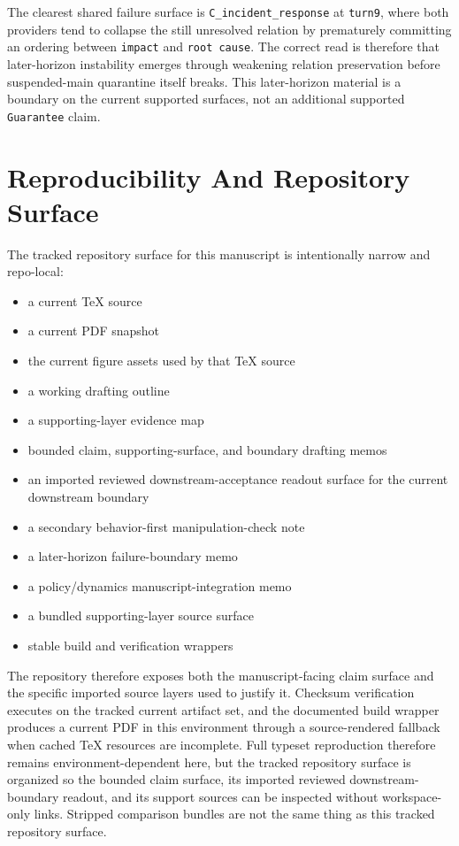 \documentclass[11pt]{article}
\begin{document}
The clearest shared failure surface is \texttt{C\_incident\_response} at
\texttt{turn9}, where both providers tend to collapse the still unresolved
relation by prematurely committing an ordering between \texttt{impact} and
\texttt{root cause}. The correct read is therefore that later-horizon
instability emerges through weakening relation preservation before
suspended-main quarantine itself breaks. This later-horizon material is a
boundary on the current supported surfaces, not an additional supported
\texttt{Guarantee} claim.

\section{Reproducibility And Repository Surface}

The tracked repository surface for this manuscript is intentionally narrow and
repo-local:
\begin{itemize}
\item a current TeX source
\item a current PDF snapshot
\item the current figure assets used by that TeX source
\item a working drafting outline
\item a supporting-layer evidence map
\item bounded claim, supporting-surface, and boundary drafting memos
\item an imported reviewed downstream-acceptance readout surface for the
current downstream boundary
\item a secondary behavior-first manipulation-check note
\item a later-horizon failure-boundary memo
\item a policy/dynamics manuscript-integration memo
\item a bundled supporting-layer source surface
\item stable build and verification wrappers
\end{itemize}

The repository therefore exposes both the manuscript-facing claim surface and
the specific imported source layers used to justify it. Checksum verification
executes on the tracked current artifact set, and the documented build wrapper
produces a current PDF in this environment through a source-rendered fallback
when cached TeX resources are incomplete. Full typeset reproduction therefore
remains environment-dependent here, but the tracked repository surface is
organized so the bounded claim surface, its imported reviewed downstream-
boundary readout, and its support sources can be inspected without workspace-
only links. Stripped comparison bundles are not the same thing as this tracked
repository surface.
\end{document}
